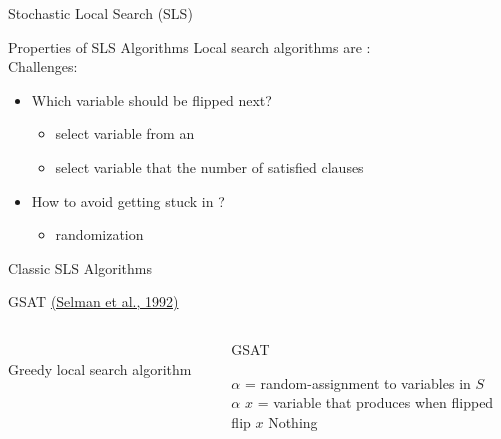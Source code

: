 \documentclass[t]{sdqbeamer}
\begin{document}
\begin{frame}{Stochastic Local Search (SLS)}
\begin{block}{Properties of SLS Algorithms}
	Local search algorithms are : \\[1em]
	Challenges: 
	\begin{itemize}\setlength{\itemsep}{1ex}
		\item Which variable should be flipped next?
		\begin{itemize}\setlength{\itemsep}{1ex}
		\item<2-> select variable from an 
		\item<2-> select variable that  the number of satisfied clauses
		\end{itemize}
	\item<2-> How to avoid getting stuck in ?
		\begin{itemize}\setlength{\itemsep}{1ex}
		\item<3-> randomization
		\end{itemize}
	\end{itemize}
\end{block}
\end{frame}
	
\begin{frame}{Classic SLS Algorithms}
\begin{block}{GSAT \href{http://dl.acm.org/citation.cfm?id=1867135.1867203}{(Selman et al., 1992)}}
\setlength\columnsep{1ex}
\begin{columns}[T]
	\begin{column}{.3\linewidth}
		~\\ Greedy local search algorithm
	\end{column}
	\begin{column}{.6\linewidth}
	\begin{algorithm}[H]
		\DontPrintSemicolon
		\caption{GSAT}
		\BlankLine
		 {
			$\alpha$ = random-assignment to variables in $S$ \\
			 {
				 {
					\Return $\alpha$
				}
				$x$ = variable that produces  when flipped \\
				flip $x$
			}
		}
		\Return Nothing 
	\end{algorithm}
	\end{column}
\end{columns}
\end{block}
\end{frame}
	
\end{document}
